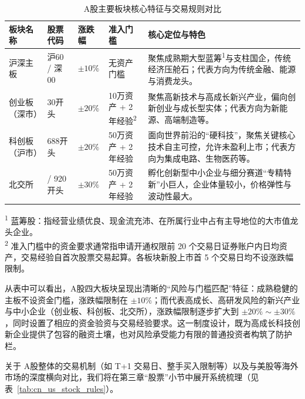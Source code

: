 \documentclass[12pt,openany]{book}
\begin{document}
\begin{table}[tbp]
    \centering
    \footnotesize
    \singlespacing
    \renewcommand{\arraystretch}{1.08}
    \caption{A股主要板块核心特征与交易规则对比}
    \label{tab:a_share_boards}
    \begin{tabularx}{\textwidth}{|>{\centering\arraybackslash\hsize=0.85\hsize}X|>{\centering\arraybackslash\hsize=0.65\hsize}X|>{\centering\arraybackslash\hsize=0.65\hsize}X|>{\centering\arraybackslash\hsize=1.05\hsize}X|>{\arraybackslash\hsize=1.80\hsize}X|}
        \hline
        板块名称 & 股票代码 & 涨跌幅 & 准入门槛 & 核心定位与特色 \\ \hline
        沪深主板 & 沪60 / 深00 & $\pm 10\%$ & 无资产门槛 & 聚焦成熟期大型蓝筹\textsuperscript{1}与支柱国企，传统经济压舱石；代表方向为传统金融、能源与消费龙头。 \\ \hline
        创业板（深市） & 30开头 & $\pm 20\%$ & 10万资产 + 2年经验\textsuperscript{2} & 聚焦高新技术与高成长新兴产业，偏向创新创业与成长型实体；代表方向为新能源、高端制造等。 \\ \hline
        科创板（沪市） & 688开头 & $\pm 20\%$ & 50万资产 + 2年经验 & 面向世界前沿的“硬科技”，聚焦关键核心技术自主可控，允许未盈利上市；代表方向为集成电路、生物医药等。 \\ \hline
        北交所 & 8 / 920开头 & $\pm 30\%$ & 50万资产 + 2年经验 & 孵化创新型中小企业与细分赛道“专精特新”小巨人，企业体量较小，价格弹性与波动性最大。 \\ \hline
    \end{tabularx}
    \par\vspace{3pt}
    {\footnotesize\singlespacing\noindent\raggedright
    \textsuperscript{1} 蓝筹股：指经营业绩优良、现金流充沛、在所属行业中占有主导地位的大市值龙头企业。\\
    \textsuperscript{2} 准入门槛中的资金要求通常指申请开通权限前 20 个交易日证券账户内日均资产，交易经验自首次股票交易起算。各板块新股上市首 5 个交易日均不设涨跌幅限制。\par}
\end{table}

从表中可以看出，A股四大板块呈现出清晰的“风险与门槛匹配”特征：成熟稳健的主板不设资金门槛，涨跌幅限制在 $\pm 10\%$；而代表高成长、高研发风险的新兴产业与中小企业（创业板、科创板、北交所），涨跌幅限制逐步扩大到 $\pm 20\%\sim\pm 30\%$，同时设置了相应的资金验资与交易经验要求。这一制度设计，既为高成长科技创新企业提供了包容的融资土壤，也对风险承受能力有限的普通投资者构筑了防护栏。

关于 A股整体的交易机制（如 T+1 交易日、整手买入限制等）以及与美股等海外市场的深度横向对比，我们将在第三章“股票”小节中展开系统梳理（见表~\ref{tab:cn_us_stock_rules}）。
\end{document}
